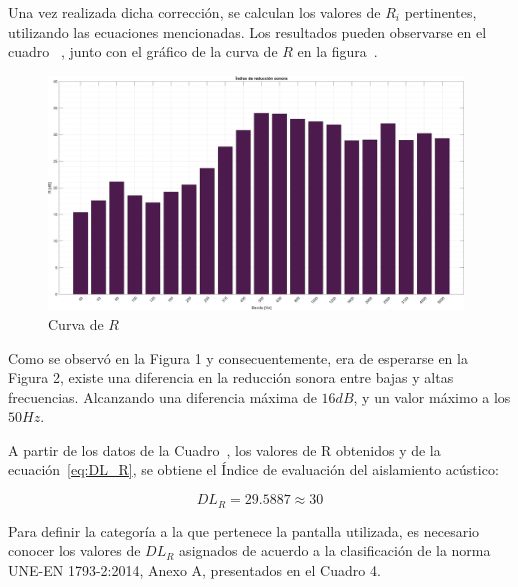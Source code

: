 \par Una vez realizada dicha corrección, se calculan los valores de $R_i$ pertinentes, utilizando las ecuaciones mencionadas. Los resultados pueden observarse en el cuadro~ , junto con el gráfico de la curva de $R$ en la figura~.



\begin{figure}[H]
	\centering
	\includegraphics[width=0.98\textwidth]{./img/Indice_reduccion_sonora_bars.png}
	\caption{Curva de $R$}
	\label{fig::indice_reduccion_sonora}
\end{figure}


\par Como se observó en la Figura 1 y consecuentemente, era de esperarse en la Figura 2, existe una diferencia en la reducción sonora entre bajas y altas frecuencias. Alcanzando una diferencia máxima de $16dB$, y un valor máximo a los $50Hz$.

\par A partir de los datos de la Cuadro~, los valores de R obtenidos y de la ecuación~\eqref{eq:DL_R}, se obtiene el Índice de evaluación del aislamiento acústico:

\begin{equation*}
    \boxed{DL_R =   29.5887 \approx 30}
\end{equation*}

\par Para definir la categoría a la que pertenece la pantalla utilizada, es necesario conocer los valores de $DL_R$ asignados de acuerdo a la clasificación de la norma UNE-EN 1793-2:2014, Anexo A, presentados en el Cuadro 4. 

